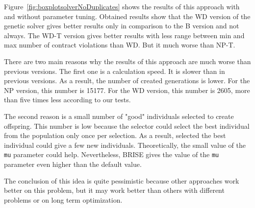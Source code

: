 Figure~\ref{fig:boxplotsolverNoDuplicates} shows the results of this approach with and without parameter tuning. Obtained results show that the WD version of the genetic solver gives better results only in comparison to the B version and not always. The WD-T version gives better results with less range between min and max number of contract violations than WD. But it much worse than NP-T.

There are two main reasons why the results of this approach are much worse than previous versions. The first one is a calculation speed. It is slower than in previous versions. As a result, the number of created generations is lower. For the NP version, this number is 15177. For the WD version, this number is 2605, more than five times less according to our tests.

The second reason is a small number of "good" individuals selected to create offspring. This number is low because the selector could select the best individual from the population only once per selection. As a result, selected the best individual could give a few new individuals. Theoretically, the small value of the \texttt{mu} parameter could help. Nevertheless, BRISE gives the value of the \texttt{mu} parameter even higher than the default value. 

The conclusion of this idea is quite pessimistic because other approaches work better on this problem, but it may work better than others with different problems or on long term optimization.


